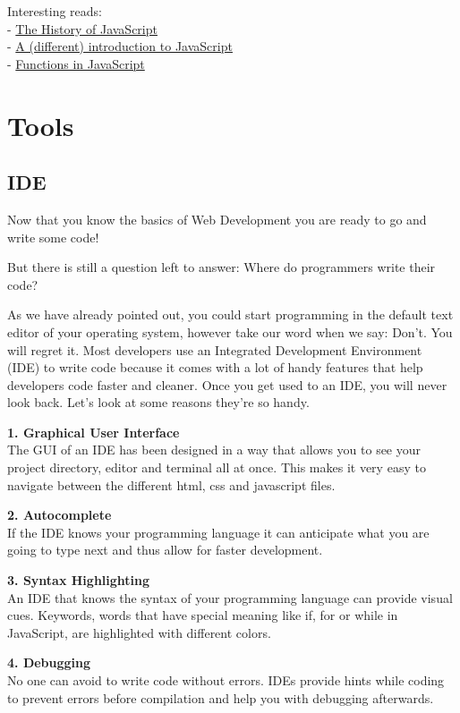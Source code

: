 \documentclass[
]{article}
\begin{document}
Interesting reads:\\
- \href{https://medium.com/@_benaston/lesson-1a-the-history-of-javascript-8c1ce3bffb17}{The History of JavaScript}\\
- \href{https://javascript.info/intro}{A (different) introduction to JavaScript}\\
- \href{https://javascript.info/function-basics}{Functions in JavaScript}

\hypertarget{tools}{%
\section{Tools}\label{tools}}

\hypertarget{ide}{%
\subsection{IDE}\label{ide}}

Now that you know the basics of Web Development you are ready to go and write some code!

But there is still a question left to answer: Where do programmers write their code?

As we have already pointed out, you could start programming in the default text editor of your operating system, however take our word when we say: Don't. You will regret it. Most developers use an Integrated Development Environment (IDE) to write code because it comes with a lot of handy features that help developers code faster and cleaner. Once you get used to an IDE, you will never look back. Let's look at some reasons they're so handy.

\textbf{1. Graphical User Interface}\\
The GUI of an IDE has been designed in a way that allows you to see your project directory, editor and terminal all at once. This makes it very easy to navigate between the different html, css and javascript files.

\textbf{2. Autocomplete}\\
If the IDE knows your programming language it can anticipate what you are going to type next and thus allow for faster development.

\textbf{3. Syntax Highlighting}\\
An IDE that knows the syntax of your programming language can provide visual cues. Keywords, words that have special meaning like if, for or while in JavaScript, are highlighted with different colors.

\textbf{4. Debugging}\\
No one can avoid to write code without errors. IDEs provide hints while coding to prevent errors before compilation and help you with debugging afterwards.
\end{document}
